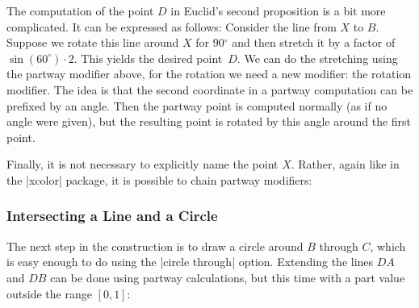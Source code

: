 \begin{paracol}{2}
The computation of the point $D$ in Euclid's second proposition is a bit more
complicated. It can be expressed as follows: Consider the line from $X$ to $B$.
Suppose we rotate this line around $X$ for 90$^\circ$ and then stretch it by a
factor of $\sin(60^\circ) \cdot 2$. This yields the desired point~$D$. We can
do the stretching using the partway modifier above, for the rotation we need a
new modifier: the rotation modifier. The idea is that the second coordinate in
a partway computation can be prefixed by an angle. Then the partway point is
computed normally (as if no angle were given), but the resulting point is
rotated by this angle around the first point.
%
\begin{codeexample}[preamble={\usetikzlibrary{calc}}]
\end{codeexample}

Finally, it is not necessary to explicitly name the point $X$. Rather, again
like in the |xcolor| package, it is possible to chain partway modifiers:
%
\begin{codeexample}[preamble={\usetikzlibrary{calc}}]
\end{codeexample}


\subsubsection{Intersecting a Line and a Circle}

The next step in the construction is to draw a circle around $B$ through $C$,
which is easy enough to do using the |circle through| option. Extending the
lines $DA$ and $DB$ can be done using partway calculations, but this time with
a part value outside the range $[0,1]$:
%
\begin{codeexample}[preamble={\usetikzlibrary{calc,through}}]
\end{codeexample}


\end{paracol}
